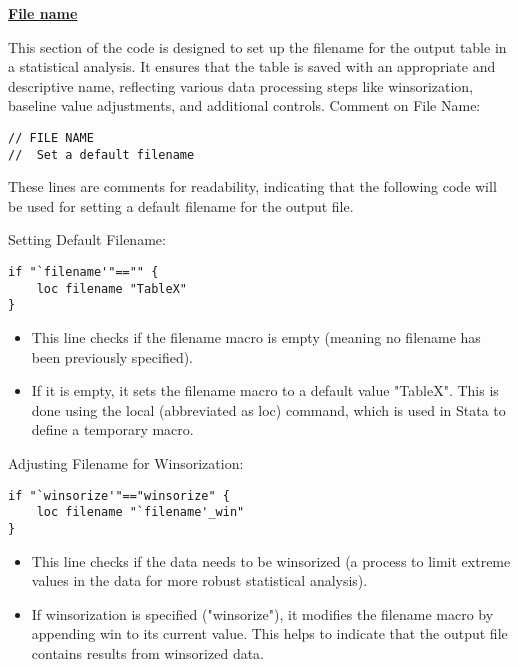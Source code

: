 \documentclass{article}
\begin{document}
\underline{\textbf{File name}}

\vspace{0.3cm} This section of the code is designed to set up the filename for the output table in a statistical analysis. It ensures that the table is saved with an appropriate and descriptive name, reflecting various data processing steps like winsorization, baseline value adjustments, and additional controls.
\vspace{0.3cm} Comment on File Name:



\begin{mdframed}
\begin{verbatim}
// FILE NAME 
// 	Set a default filename 
\end{verbatim}
\end{mdframed}

These lines are comments for readability, indicating that the following code will be used for setting a default filename for the output file. \newline

Setting Default Filename:
\begin{mdframed}
\begin{verbatim}
if "`filename'"=="" {
	loc filename "TableX"
}
\end{verbatim}
\end{mdframed}

\begin{itemize}
    \item This line checks if the filename macro is empty (meaning no filename has been previously specified).
    \item If it is empty, it sets the filename macro to a default value "TableX". This is done using the local (abbreviated as loc) command, which is used in Stata to define a temporary macro.
\end{itemize}

Adjusting Filename for Winsorization:
\begin{mdframed}
\begin{verbatim}
if "`winsorize'"=="winsorize" {
	loc filename "`filename'_win"
}
\end{verbatim}
\end{mdframed}

\begin{itemize}
    \item This line checks if the data needs to be winsorized (a process to limit extreme values in the data for more robust statistical analysis).
    \item If winsorization is specified ("winsorize"), it modifies the filename macro by appending win to its current value. This helps to indicate that the output file contains results from winsorized data.
\end{itemize}
\end{document}

